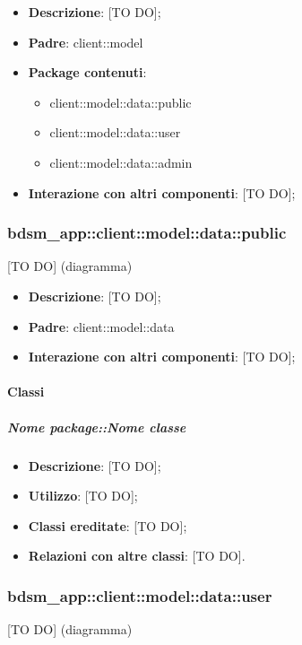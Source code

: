 	\begin{itemize}
		\item \textbf{Descrizione}: [TO DO];
		\item \textbf{Padre}: client::model
		\item \textbf{Package contenuti}:
			\begin{itemize}
				\item client::model::data::public
				\item client::model::data::user
				\item client::model::data::admin
			\end{itemize}
		\item \textbf{Interazione con altri componenti}: [TO DO];
	\end{itemize}

	\subsubsection{bdsm\_app::client::model::data::public} %
	\label{ssub:bdsm_app_client_model_data_public}
	[TO DO] (diagramma) \newline \newline

	\begin{itemize}
		\item \textbf{Descrizione}: [TO DO];
		\item \textbf{Padre}: client::model::data
		\item \textbf{Interazione con altri componenti}: [TO DO];
	\end{itemize}

		\paragraph{Classi} %
			\subparagraph{Nome package::Nome classe} %
			\label{subp:subparagraph_name}
				\begin{itemize}
					\item \textbf{Descrizione}: [TO DO];
					\item \textbf{Utilizzo}: [TO DO];
					\item \textbf{Classi ereditate}: [TO DO];
					\item \textbf{Relazioni con altre classi}: [TO DO].
				\end{itemize}	

	\subsubsection{bdsm\_app::client::model::data::user} %
	\label{ssub:bdsm_app_client_model_data_user}
	[TO DO] (diagramma) \newline \newline

